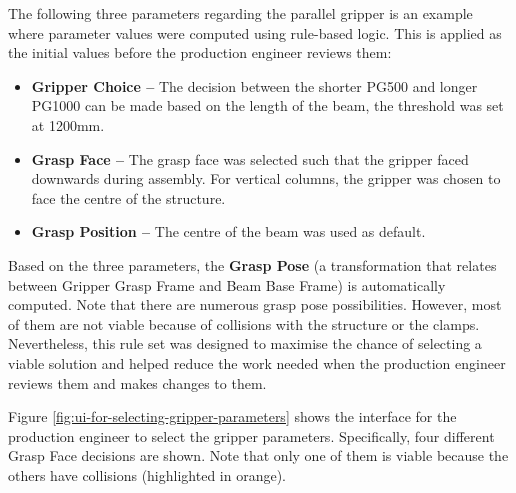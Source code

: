 The following three parameters regarding the parallel gripper is an example where parameter values were computed using rule-based logic. This is applied as the initial values before the production engineer reviews them:

\begin{itemize}
	\item \textbf{Gripper Choice --} The decision between the shorter PG500 and longer PG1000 can be made based on the length of the beam, the threshold was set at 1200mm.

	\item \textbf{Grasp Face --} The grasp face was selected such that the gripper faced downwards during assembly. For vertical columns, the gripper was chosen to face the centre of the structure.

	\item \textbf{Grasp Position --} The centre of the beam was used as default. 

\end{itemize}
Based on the three parameters, the \textbf{Grasp Pose} (a transformation that relates between Gripper Grasp Frame and Beam Base Frame) is automatically computed. Note that there are numerous grasp pose possibilities. However, most of them are not viable because of collisions with the structure or the clamps. Nevertheless, this rule set was designed to maximise the chance of selecting a viable solution and helped reduce the work needed when the production engineer reviews them and makes changes to them. 

Figure \ref{fig:ui-for-selecting-gripper-parameters} shows the interface for the production engineer to select the gripper parameters. Specifically, four different Grasp Face decisions are shown. Note that only one of them is viable because the others have collisions (highlighted in orange). 


